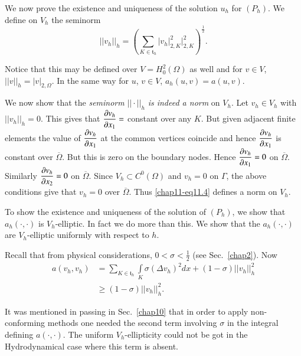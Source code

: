 We now prove the existence and uniqueness of the solution $u_{h}$ for
$(P_{h})$. We define on $V_{h}$ the seminorm
\begin{equation*}
||v_{h}||_{h}=\left(\sum_{K\in\mathfrak{t}_{h}}|v_{h}|^{2}_{2,K}|^{2}_{2,K}\right)^{\frac{1}{2}}. \tag{11.4}\label{chap11-eq11.4}
\end{equation*}

Notice that this may be defined over $V=H^{2}_{0}(\Omega)$ as well and
for $v\in V$, $||v||_{h}=|v|_{2,\Omega}$. In the same way for $u$,
$v\in V$, $a_{h}(u,v)=a(u,v)$.

We now show that the {\em seminorm} $||\cdot||_{h}$ {\em is indeed a
  norm} on $V_{h}$. Let $v_{h}\in V_{h}$ with $||v_{h}||_{h}=0$. This
gives that $\dfrac{\partial v_{h}}{\partial x_{1}}=$ constant over any $K$. But
given adjacent finite elements the value of $\dfrac{\partial v_{h}}{\partial
  x_{1}}$ at the common vertices coincide and hence $\dfrac{\partial
  v_{h}}{\partial x_{1}}$ is constant over $\overline{\Omega}$. But this is
zero on the boundary nodes. Hence $\dfrac{\partial v_{h}}{\partial x_{1}}=0$ on
$\overline{\Omega}$. Similarly $\dfrac{\partial v_{h}}{\partial x_{2}}=0$ on
$\overline{\Omega}$. Since $V_{h}\subset C^{0}(\Omega)$ and $v_{h}=0$
on $\Gamma$, the above conditions give that $v_{h}=0$ over
$\overline{\Omega}$. Thus \eqref{chap11-eq11.4} defines a norm on
$V_{h}$.

To show the existence and uniqueness of the solution of $(P_{h})$, we
show that $a_{h}(\cdot,\cdot)$ is $V_{h}$-elliptic. In fact we do more
than this. We show that the $a_{h}(\cdot,\cdot)$ are $V_{h}$-elliptic
uniformly with respect to $h$.

Recall that from physical considerations, $0<\sigma <\frac{1}{2}$ (see
Sec.~\ref{chap2}). Now
\begin{equation*}
\begin{split}
a(v_{h},v_{h}) &=
\sum_{K\in\mathfrak{t}_{h}}\int\limits_{K}\sigma(\Delta
v_{h})^{2}dx+(1-\sigma)||v_{h}||^{2}_{h}\\
&\geq (1-\sigma)||v_{h}||^{2}_{h}.
\end{split}\tag{11.5}\label{chap11-eq11.5}
\end{equation*}

\begin{remark}\label{chap11-rem11.1}
It was mentioned in passing in Sec.~\ref{chap10} that in order to
apply non-conforming methods one needed the second term involving
$\sigma$ in the integral defining $a(\cdot,\cdot)$. The uniform
$V_{h}$-ellipticity could not be got in the Hydrodynamical case where
this term is absent.
\end{remark}

